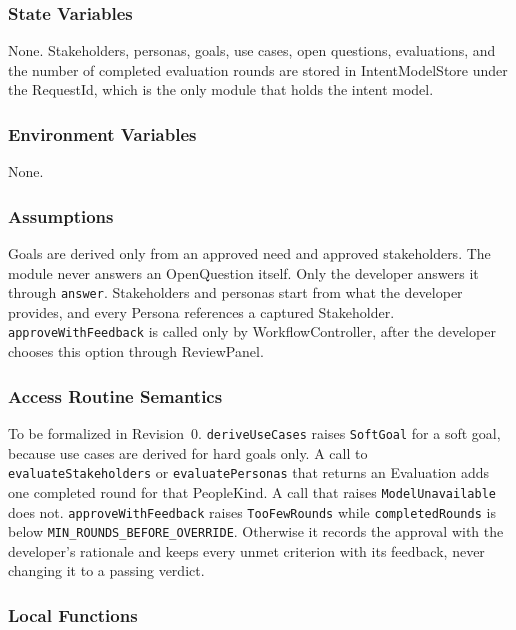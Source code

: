 \documentclass[12pt, titlepage]{article}
\begin{document}
\subsubsection{State Variables}

None. Stakeholders, personas, goals, use cases, open questions, evaluations,
and the number of completed evaluation rounds are stored in IntentModelStore
under the RequestId, which is the only module that holds the intent model.

\subsubsection{Environment Variables}

None.

\subsubsection{Assumptions}

Goals are derived only from an approved need and approved stakeholders. The
module never answers an OpenQuestion itself. Only the developer answers it
through \texttt{answer}. Stakeholders and personas start from what the
developer provides, and every Persona references a captured Stakeholder.
\texttt{approveWithFeedback} is called only by WorkflowController, after the
developer chooses this option through ReviewPanel.

\subsubsection{Access Routine Semantics}

To be formalized in Revision~0. \texttt{deriveUseCases} raises
\texttt{SoftGoal} for a soft goal, because use cases are derived for hard goals
only. A call to \texttt{evaluateStakeholders} or \texttt{evaluatePersonas} that
returns an Evaluation adds one completed round for that PeopleKind. A call that
raises \texttt{ModelUnavailable} does not. \texttt{approveWithFeedback} raises
\texttt{TooFewRounds} while \texttt{completedRounds} is below
\texttt{MIN\_ROUNDS\_BEFORE\_OVERRIDE}. Otherwise it records the approval with
the developer's rationale and keeps every unmet criterion with its feedback,
never changing it to a passing verdict.

\subsubsection{Local Functions}
\end{document}

